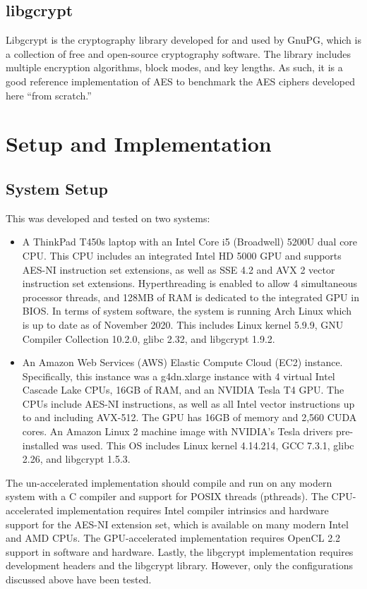 \documentclass[a4paper,10pt]{article}
\begin{document}
\subsection{libgcrypt}

Libgcrypt is the cryptography library developed for and used by GnuPG\cite{libgcrypt}, which is a collection of free and open-source cryptography software.  The library includes multiple encryption algorithms, block modes, and key lengths.  As such, it is a good reference implementation of AES to benchmark the AES ciphers developed here ``from scratch.''

\section{Setup and Implementation}
 
\subsection{System Setup}

This was developed and tested on two systems:
\begin{itemize}
\item{A ThinkPad T450s laptop with an Intel Core i5 (Broadwell) 5200U dual core CPU.  This CPU includes an integrated Intel HD 5000 GPU and supports AES-NI instruction set extensions, as well as SSE 4.2 and AVX 2 vector instruction set extensions.  Hyperthreading is enabled to allow 4 simultaneous processor threads, and 128MB of RAM is dedicated to the integrated GPU in BIOS.  In terms of system software, the system is running Arch Linux which is up to date as of November 2020.  This includes Linux kernel 5.9.9, GNU Compiler Collection 10.2.0, glibc 2.32, and libgcrypt 1.9.2.}

\item{An Amazon Web Services (AWS) Elastic Compute Cloud (EC2) instance.  Specifically, this instance was a g4dn.xlarge instance with 4 virtual Intel Cascade Lake CPUs, 16GB of RAM, and an NVIDIA Tesla T4 GPU.  The CPUs include AES-NI instructions, as well as all Intel vector instructions up to and including AVX-512.  The GPU has 16GB of memory and 2,560 CUDA cores.  An Amazon Linux 2 machine image with NVIDIA's Tesla drivers pre-installed was used.  This OS includes Linux kernel 4.14.214, GCC 7.3.1, glibc 2.26, and libgcrypt 1.5.3.}
\end{itemize}

The un-accelerated implementation should compile and run on any modern system with a C compiler and support for POSIX threads (pthreads).  The CPU-accelerated implementation requires Intel compiler intrinsics and hardware support for the AES-NI extension set, which is available on many modern Intel and AMD CPUs.  The GPU-accelerated implementation requires OpenCL 2.2 support in software and hardware.  Lastly, the libgcrypt implementation requires development headers and the libgcrypt library.  However, only the configurations discussed above have been tested.
\end{document}
